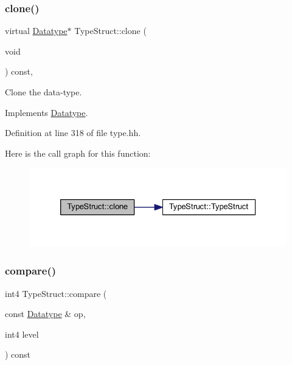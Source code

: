 \subsubsection{\texorpdfstring{clone()}{clone()}}
{\footnotesize\ttfamily virtual \mbox{\hyperlink{class_datatype}{Datatype}}$\ast$ Type\+Struct\+::clone (\begin{DoxyParamCaption}\item[{void}]{ }\end{DoxyParamCaption}) const\hspace{0.3cm}{\ttfamily [inline]}, {\ttfamily [virtual]}}



Clone the data-\/type. 



Implements \mbox{\hyperlink{class_datatype_a6bd032d91f40efe36841adc85b3ff0ec}{Datatype}}.



Definition at line 318 of file type.\+hh.

Here is the call graph for this function\+:
\nopagebreak
\begin{figure}[H]
\begin{center}
\leavevmode
\includegraphics[width=326pt]{class_type_struct_a24e7e1af1cc231759cecf8445532f613_cgraph}
\end{center}
\end{figure}
\mbox{\label{class_type_struct_a7f06b400a7d74394512a9f67ec925310}} 
\subsubsection{\texorpdfstring{compare()}{compare()}}
{\footnotesize\ttfamily int4 Type\+Struct\+::compare (\begin{DoxyParamCaption}\item[{const \mbox{\hyperlink{class_datatype}{Datatype}} \&}]{op,  }\item[{int4}]{level }\end{DoxyParamCaption}) const\hspace{0.3cm}{\ttfamily [virtual]}}



